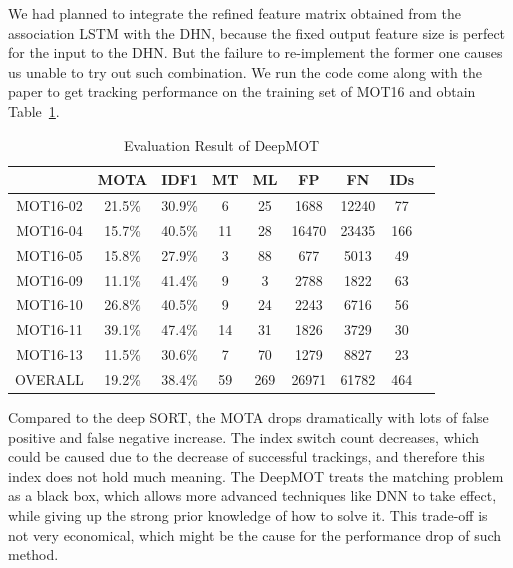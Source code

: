\documentclass[conference]{IEEEtran}
\begin{document}

We had planned to integrate the refined feature matrix obtained from the association LSTM with the DHN, because the fixed output feature size is perfect for the input to the DHN.
But the failure to re-implement the former one causes us unable to try out such combination.
We run the code come along with the paper to get tracking performance on the training set of MOT16 and obtain Table~\ref{tab:eval-deepmot}.

\linespread{1.2}
\begin{table}[h]
    \caption{Evaluation Result of DeepMOT}
    \label{tab:eval-deepmot}
    \begin{tabular}{ccccccccc}
        \hline
        & MOTA & IDF1 & MT & ML & FP & FN & IDs\\\hline
        MOT16-02 & 21.5\% & 30.9\% & 6 & 25 & 1688 & 12240 & 77\\
        MOT16-04 & 15.7\% & 40.5\% & 11 & 28 & 16470 & 23435 & 166\\
        MOT16-05 & 15.8\% & 27.9\% & 3 & 88 & 677 & 5013 & 49\\
        MOT16-09 & 11.1\% & 41.4\% & 9 & 3 & 2788 & 1822 & 63\\
        MOT16-10 & 26.8\% & 40.5\% & 9 & 24 & 2243 & 6716 & 56\\
        MOT16-11 & 39.1\% & 47.4\% & 14 & 31 & 1826 & 3729 & 30\\
        MOT16-13 & 11.5\% & 30.6\% & 7 & 70 & 1279 & 8827 & 23\\
        OVERALL & 19.2\% & 38.4\% & 59 & 269 & 26971 & 61782 & 464\\\hline
    \end{tabular}
\end{table}
\linespread{1.0}

Compared to the deep SORT, the MOTA drops dramatically with lots of false positive and false negative increase.
The index switch count decreases, which could be caused due to the decrease of successful trackings, and therefore this index does not hold much meaning.
The DeepMOT treats the matching problem as a black box, which allows more advanced techniques like DNN to take effect, while giving up the strong prior knowledge of how to solve it.
This trade-off is not very economical, which might be the cause for the performance drop of such method.

\end{document}
